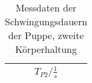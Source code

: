\begin{table}[h!]
  \centering
  \caption{Messdaten der Schwingungsdauern der Puppe, zweite Körperhaltung}
  \label{tab:puppe2}
  \begin{tabular}{c}
    \toprule
     $T_{P2}/\si{\frac{1}{s}}$\\
    \midrule
      
    \bottomrule
  \end{tabular}
\end{table}

